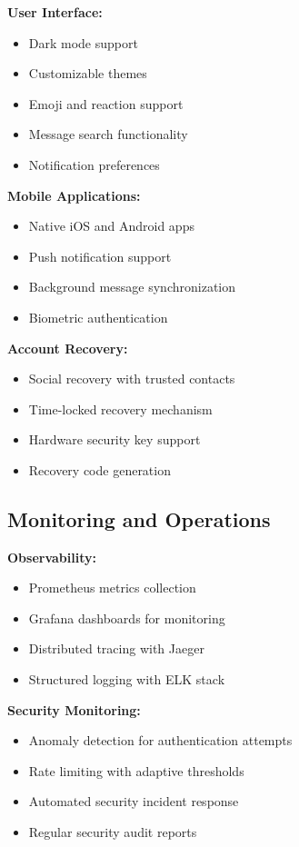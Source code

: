 \textbf{User Interface:}
\begin{itemize}
    \item Dark mode support
    \item Customizable themes
    \item Emoji and reaction support
    \item Message search functionality
    \item Notification preferences
\end{itemize}

\textbf{Mobile Applications:}
\begin{itemize}
    \item Native iOS and Android apps
    \item Push notification support
    \item Background message synchronization
    \item Biometric authentication
\end{itemize}

\textbf{Account Recovery:}
\begin{itemize}
    \item Social recovery with trusted contacts
    \item Time-locked recovery mechanism
    \item Hardware security key support
    \item Recovery code generation
\end{itemize}

\subsection{Monitoring and Operations}

\textbf{Observability:}
\begin{itemize}
    \item Prometheus metrics collection
    \item Grafana dashboards for monitoring
    \item Distributed tracing with Jaeger
    \item Structured logging with ELK stack
\end{itemize}

\textbf{Security Monitoring:}
\begin{itemize}
    \item Anomaly detection for authentication attempts
    \item Rate limiting with adaptive thresholds
    \item Automated security incident response
    \item Regular security audit reports
\end{itemize}

